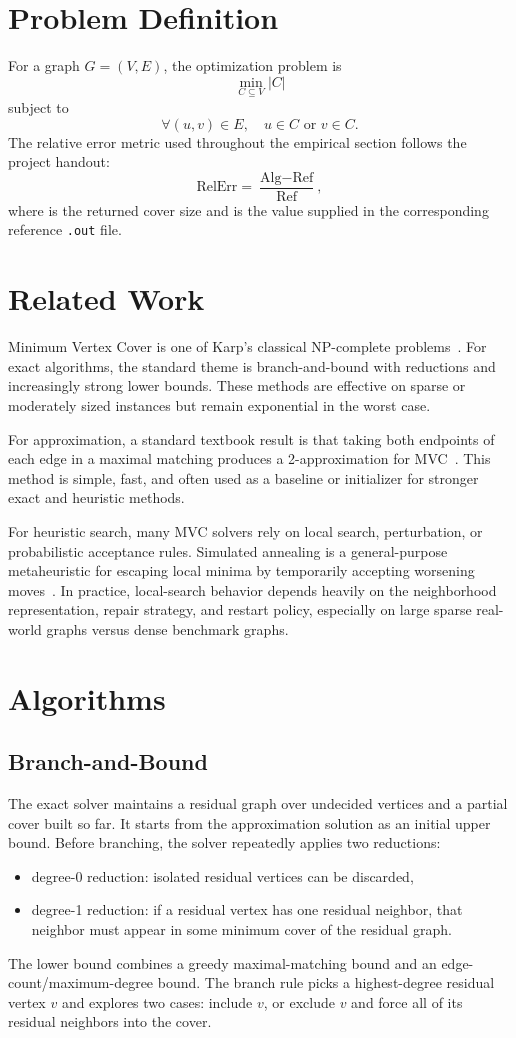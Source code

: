 \documentclass[sigconf,nonacm]{acmart}
\begin{document}
\section{Problem Definition}
For a graph $G=(V,E)$, the optimization problem is
\[
\min_{C \subseteq V} |C|
\]
subject to
\[
\forall (u,v)\in E,\quad u\in C \text{ or } v\in C.
\]
The relative error metric used throughout the empirical section follows the project handout:
\[
\text{RelErr} = \frac{\text{Alg} - \text{Ref}}{\text{Ref}},
\]
where  is the returned cover size and  is the value supplied in the corresponding reference \texttt{.out} file.

\section{Related Work}
Minimum Vertex Cover is one of Karp's classical NP-complete problems~\cite{karp}. For exact algorithms, the standard theme is branch-and-bound with reductions and increasingly strong lower bounds. These methods are effective on sparse or moderately sized instances but remain exponential in the worst case.

For approximation, a standard textbook result is that taking both endpoints of each edge in a maximal matching produces a 2-approximation for MVC~\cite{vazirani}. This method is simple, fast, and often used as a baseline or initializer for stronger exact and heuristic methods.

For heuristic search, many MVC solvers rely on local search, perturbation, or probabilistic acceptance rules. Simulated annealing is a general-purpose metaheuristic for escaping local minima by temporarily accepting worsening moves~\cite{kirkpatrick}. In practice, local-search behavior depends heavily on the neighborhood representation, repair strategy, and restart policy, especially on large sparse real-world graphs versus dense benchmark graphs.

\section{Algorithms}
\subsection{Branch-and-Bound}
The exact solver maintains a residual graph over undecided vertices and a partial cover built so far. It starts from the approximation solution as an initial upper bound. Before branching, the solver repeatedly applies two reductions:
\begin{itemize}
\item degree-0 reduction: isolated residual vertices can be discarded,
\item degree-1 reduction: if a residual vertex has one residual neighbor, that neighbor must appear in some minimum cover of the residual graph.
\end{itemize}
The lower bound combines a greedy maximal-matching bound and an edge-count/maximum-degree bound. The branch rule picks a highest-degree residual vertex $v$ and explores two cases: include $v$, or exclude $v$ and force all of its residual neighbors into the cover.
\end{document}
